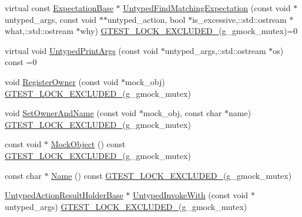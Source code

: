 \begin{DoxyCompactItemize}
\item 
virtual const \hyperlink{classtesting_1_1internal_1_1_expectation_base}{Expectation\+Base} $\ast$ \hyperlink{classtesting_1_1internal_1_1_untyped_function_mocker_base_a6461abd05786eee4e125a2695382852d}{Untyped\+Find\+Matching\+Expectation} (const void $\ast$untyped\+\_\+args, const void $\ast$$\ast$untyped\+\_\+action, bool $\ast$is\+\_\+excessive,\+::std\+::ostream $\ast$what,\+::std\+::ostream $\ast$why) \hyperlink{gtest-port_8h_a69abff5a4efdd07bd5faebe3dd318d06}{G\+T\+E\+S\+T\+\_\+\+L\+O\+C\+K\+\_\+\+E\+X\+C\+L\+U\+D\+E\+D\+\_\+}(g\+\_\+gmock\+\_\+mutex)=0
\item 
virtual void \hyperlink{classtesting_1_1internal_1_1_untyped_function_mocker_base_a3bd7439b411fc00f7d9f9a6f9591ae2c}{Untyped\+Print\+Args} (const void $\ast$untyped\+\_\+args,\+::std\+::ostream $\ast$os) const =0
\item 
void \hyperlink{classtesting_1_1internal_1_1_untyped_function_mocker_base_a0cd3dd14b92c714eab690c9597f32ffd}{Register\+Owner} (const void $\ast$mock\+\_\+obj) \hyperlink{gtest-port_8h_a69abff5a4efdd07bd5faebe3dd318d06}{G\+T\+E\+S\+T\+\_\+\+L\+O\+C\+K\+\_\+\+E\+X\+C\+L\+U\+D\+E\+D\+\_\+}(g\+\_\+gmock\+\_\+mutex)
\item 
void \hyperlink{classtesting_1_1internal_1_1_untyped_function_mocker_base_a287bcacee639b7d123cec29e0614fe96}{Set\+Owner\+And\+Name} (const void $\ast$mock\+\_\+obj, const char $\ast$name) \hyperlink{gtest-port_8h_a69abff5a4efdd07bd5faebe3dd318d06}{G\+T\+E\+S\+T\+\_\+\+L\+O\+C\+K\+\_\+\+E\+X\+C\+L\+U\+D\+E\+D\+\_\+}(g\+\_\+gmock\+\_\+mutex)
\item 
const void $\ast$ \hyperlink{classtesting_1_1internal_1_1_untyped_function_mocker_base_a71863dd67193a7082078d5b366d5ce51}{Mock\+Object} () const \hyperlink{gtest-port_8h_a69abff5a4efdd07bd5faebe3dd318d06}{G\+T\+E\+S\+T\+\_\+\+L\+O\+C\+K\+\_\+\+E\+X\+C\+L\+U\+D\+E\+D\+\_\+}(g\+\_\+gmock\+\_\+mutex)
\item 
const char $\ast$ \hyperlink{classtesting_1_1internal_1_1_untyped_function_mocker_base_ae90a5b5d48db1e99634bc6ff39ded335}{Name} () const \hyperlink{gtest-port_8h_a69abff5a4efdd07bd5faebe3dd318d06}{G\+T\+E\+S\+T\+\_\+\+L\+O\+C\+K\+\_\+\+E\+X\+C\+L\+U\+D\+E\+D\+\_\+}(g\+\_\+gmock\+\_\+mutex)
\item 
\hyperlink{classtesting_1_1internal_1_1_untyped_action_result_holder_base}{Untyped\+Action\+Result\+Holder\+Base} $\ast$ \hyperlink{classtesting_1_1internal_1_1_untyped_function_mocker_base_adaec41c0ba8a07c2415f6c8efa0ca54f}{Untyped\+Invoke\+With} (const void $\ast$untyped\+\_\+args) \hyperlink{gtest-port_8h_a69abff5a4efdd07bd5faebe3dd318d06}{G\+T\+E\+S\+T\+\_\+\+L\+O\+C\+K\+\_\+\+E\+X\+C\+L\+U\+D\+E\+D\+\_\+}(g\+\_\+gmock\+\_\+mutex)
\end{DoxyCompactItemize}
